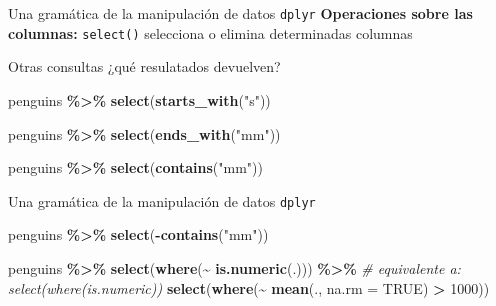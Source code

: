 \documentclass[
  ignorenonframetext,
  aspectratio=169]{beamer}
\newenvironment{Shaded}{\begin{snugshade}}{\end{snugshade}}
\newcommand{\AttributeTok}[1]{\textcolor[rgb]{0.13,0.29,0.53}{#1}}
\newcommand{\CommentTok}[1]{\textcolor[rgb]{0.56,0.35,0.01}{\textit{#1}}}
\newcommand{\ConstantTok}[1]{\textcolor[rgb]{0.56,0.35,0.01}{#1}}
\newcommand{\DecValTok}[1]{\textcolor[rgb]{0.00,0.00,0.81}{#1}}
\newcommand{\FunctionTok}[1]{\textcolor[rgb]{0.13,0.29,0.53}{\textbf{#1}}}
\newcommand{\NormalTok}[1]{#1}
\newcommand{\SpecialCharTok}[1]{\textcolor[rgb]{0.81,0.36,0.00}{\textbf{#1}}}
\newcommand{\StringTok}[1]{\textcolor[rgb]{0.31,0.60,0.02}{#1}}
\begin{document}
\begin{frame}[fragile]{Una gramática de la manipulación de datos
\texttt{dplyr}}
\label{una-gramuxe1tica-de-la-manipulaciuxf3n-de-datos-dplyr-15}
\textbf{Operaciones sobre las columnas:} \texttt{select()} selecciona o
elimina determinadas columnas

Otras consultas ¿qué resulatados devuelven?

\begin{Shaded}
\begin{Highlighting}[]
\NormalTok{penguins }\SpecialCharTok{\%\textgreater{}\%} 
  \FunctionTok{select}\NormalTok{(}\FunctionTok{starts\_with}\NormalTok{(}\StringTok{"s"}\NormalTok{))}
\end{Highlighting}
\end{Shaded}

\begin{Shaded}
\begin{Highlighting}[]
\NormalTok{penguins }\SpecialCharTok{\%\textgreater{}\%} 
  \FunctionTok{select}\NormalTok{(}\FunctionTok{ends\_with}\NormalTok{(}\StringTok{"mm"}\NormalTok{))}
\end{Highlighting}
\end{Shaded}

\begin{Shaded}
\begin{Highlighting}[]
\NormalTok{penguins }\SpecialCharTok{\%\textgreater{}\%} 
  \FunctionTok{select}\NormalTok{(}\FunctionTok{contains}\NormalTok{(}\StringTok{"mm"}\NormalTok{))}
\end{Highlighting}
\end{Shaded}
\end{frame}

\begin{frame}[fragile]{Una gramática de la manipulación de datos
\texttt{dplyr}}
\label{una-gramuxe1tica-de-la-manipulaciuxf3n-de-datos-dplyr-16}
\begin{Shaded}
\begin{Highlighting}[]
\NormalTok{penguins }\SpecialCharTok{\%\textgreater{}\%} 
  \FunctionTok{select}\NormalTok{(}\SpecialCharTok{{-}}\FunctionTok{contains}\NormalTok{(}\StringTok{"mm"}\NormalTok{))}
\end{Highlighting}
\end{Shaded}

\begin{Shaded}
\begin{Highlighting}[]
\NormalTok{penguins }\SpecialCharTok{\%\textgreater{}\%} 
  \FunctionTok{select}\NormalTok{(}\FunctionTok{where}\NormalTok{(}\SpecialCharTok{\textasciitilde{}} \FunctionTok{is.numeric}\NormalTok{(.))) }\SpecialCharTok{\%\textgreater{}\%} \CommentTok{\# equivalente a: select(where(is.numeric))}
  \FunctionTok{select}\NormalTok{(}\FunctionTok{where}\NormalTok{(}\SpecialCharTok{\textasciitilde{}} \FunctionTok{mean}\NormalTok{(., }\AttributeTok{na.rm =} \ConstantTok{TRUE}\NormalTok{) }\SpecialCharTok{\textgreater{}} \DecValTok{1000}\NormalTok{))}
\end{Highlighting}
\end{Shaded}
\end{frame}
\end{document}
